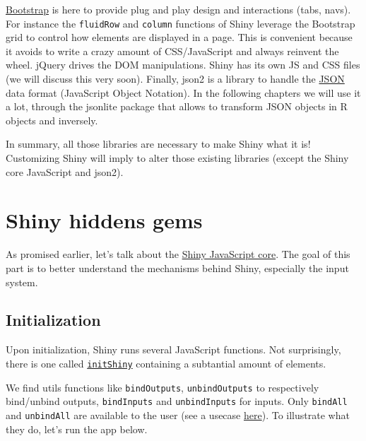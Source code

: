 \documentclass[]{book}
\begin{document}
\href{https://getbootstrap.com}{Bootstrap} is here to provide plug and play design and interactions (tabs, navs). For instance the \texttt{fluidRow} and \texttt{column} functions of Shiny leverage the Bootstrap grid to control how elements are displayed in a page. This is convenient because it avoids to write a crazy amount of CSS/JavaScript and always reinvent the wheel. jQuery drives the DOM manipulations. Shiny has its own JS and CSS files (we will discuss this very soon). Finally, json2 is a library to handle the \href{https://www.json.org/json-en.html}{JSON} data format (JavaScript Object Notation). In the following chapters we will use it a lot, through the jsonlite package that allows to transform JSON objects in R objects and inversely.

In summary, all those libraries are necessary to make Shiny what it is! Customizing Shiny will imply to alter those existing libraries (except the Shiny core JavaScript and json2).

\hypertarget{shiny-hiddens-gems}{%
\section{Shiny hiddens gems}\label{shiny-hiddens-gems}}

As promised earlier, let's talk about the \href{https://github.com/rstudio/shiny/blob/master/srcjs/init_shiny.js}{Shiny JavaScript core}. The goal of this part is to better understand the mechanisms behind Shiny, especially the input system.

\hypertarget{initialization}{%
\subsection{Initialization}\label{initialization}}

Upon initialization, Shiny runs several JavaScript functions. Not surprisingly, there is one called \href{https://github.com/rstudio/shiny/blob/master/srcjs/init_shiny.js}{\texttt{initShiny}} containing a subtantial amount of elements.

We find utils functions like \texttt{bindOutputs}, \texttt{unbindOutputs} to respectively bind/unbind outputs, \texttt{bindInputs} and \texttt{unbindInputs} for inputs. Only \texttt{bindAll} and \texttt{unbindAll} are available to the user (see a usecase \href{https://stackoverflow.com/questions/51633326/dateinput-not-working-on-dt-in-shiny}{here}). To illustrate what they do, let's run the app below.
\end{document}
